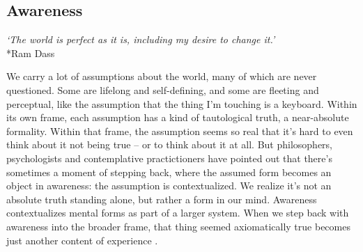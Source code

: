 \documentclass[12pt]{article}
\begin{document}
\subsection{Awareness}

\begin{center}
\textit{`The world is perfect as it is, including my desire to change it.'}\\*Ram Dass
\end{center}

We carry a lot of assumptions about the world, many of which are never questioned. Some are lifelong and self-defining, and some are fleeting and perceptual, like the assumption that the thing I'm touching is a keyboard. Within its own frame, each assumption has a kind of tautological truth, a near-absolute formality. Within that frame, the assumption seems so real that it's hard to even think about it not being true -- or to think about it at all. But philosophers, psychologists and contemplative practictioners have pointed out that there's sometimes a moment of stepping back, where the assumed form becomes an object in awareness: the assumption is contextualized. We realize it's not an absolute truth standing alone, but rather a form in our mind. Awareness contextualizes mental forms as part of a larger system. When we step back with awareness into the broader frame, that thing seemed axiomatically true becomes just another content of experience \citep{watts2011wisdom, jung1969archetypes, bodhi2000connected, wegner1994ironic,beisser1970paradoxical, wilber1996atman, suzuki1970zen, krishnamurti1969freedom, stemless2025harmony, kegan1982evolving}. 



\end{document}
